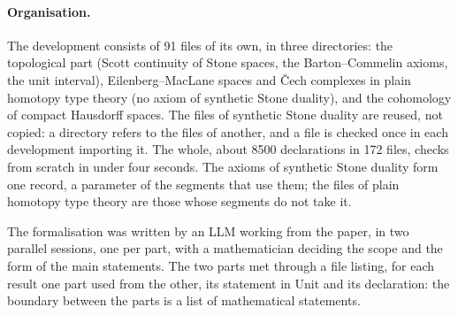\documentclass[11pt]{article}
\newcommand{\sys}{\textsf{Unit}\xspace}
\theoremstyle{remark}
\begin{document}
\paragraph{Organisation.} The development consists of 91 files of its
own, in three directories: the topological part (Scott continuity of
Stone spaces, the Barton--Commelin axioms, the unit interval),
Eilenberg--MacLane spaces and Čech complexes in plain homotopy type
theory (no axiom of synthetic Stone duality), and the cohomology of
compact Hausdorff spaces. The files of synthetic Stone duality are
reused, not copied: a directory refers to the files of another, and a
file is checked once in each development importing it. The whole,
about 8500 declarations in 172 files, checks from scratch in under four
seconds. The axioms of synthetic Stone duality form one record, a parameter of
the segments that use them; the files of plain homotopy type theory are
those whose segments do not take it.

The formalisation was written by an LLM working from the paper, in
two parallel sessions, one per part, with a mathematician deciding the
scope and the form of the main statements. The two parts met through a
file listing, for each result one part used from the other, its
statement in \sys and its declaration: the boundary between the parts
is a list of mathematical statements.
\end{document}
